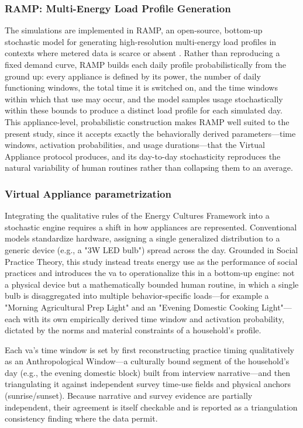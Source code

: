 \documentclass[final,3p,times,onecolumn]{elsarticle}
\begin{document}
\subsubsection{RAMP: Multi-Energy Load Profile Generation}
\label{sec:ramp}
The simulations are implemented in RAMP, an open-source, bottom-up stochastic model for generating high-resolution multi-energy load profiles in contexts where metered data is scarce or absent \cite{lombardi_ramp_2024}. Rather than reproducing a fixed demand curve, RAMP builds each daily profile probabilistically from the ground up: every appliance is defined by its power, the number of daily functioning windows, the total time it is switched on, and the time windows within which that use may occur, and the model samples usage stochastically within these bounds to produce a distinct load profile for each simulated day. This appliance-level, probabilistic construction makes RAMP well suited to the present study, since it accepts exactly the behaviorally derived parameters—time windows, activation probabilities, and usage durations—that the Virtual Appliance protocol produces, and its day-to-day stochasticity reproduces the natural variability of human routines rather than collapsing them to an average.

\subsubsection{Virtual Appliance parametrization}
\label{sec:va_parametrization}

Integrating the qualitative rules of the Energy Cultures Framework into a stochastic engine requires a shift in how appliances are represented. Conventional models standardize hardware, assigning a single generalized distribution to a generic device (e.g., a "3W LED bulb") spread across the day. Grounded in Social Practice Theory, this study instead treats energy use as the performance of social practices \cite{shove_what_2014} and introduces the \gls{va} to operationalize this in a bottom-up engine: not a physical device but a mathematically bounded human routine, in which a single bulb is disaggregated into multiple behavior-specific loads—for example a "Morning Agricultural Prep Light" and an "Evening Domestic Cooking Light"—each with its own empirically derived time window and activation probability, dictated by the norms and material constraints of a household's profile.

Each \gls{va}'s time window is set by first reconstructing practice timing qualitatively as an Anthropological Window—a culturally bound segment of the household's day (e.g., the evening domestic block) built from interview narrative—and then triangulating it against independent survey time-use fields and physical anchors (sunrise/sunset). Because narrative and survey evidence are partially independent, their agreement is itself checkable and is reported as a triangulation consistency finding where the data permit.
\end{document}
